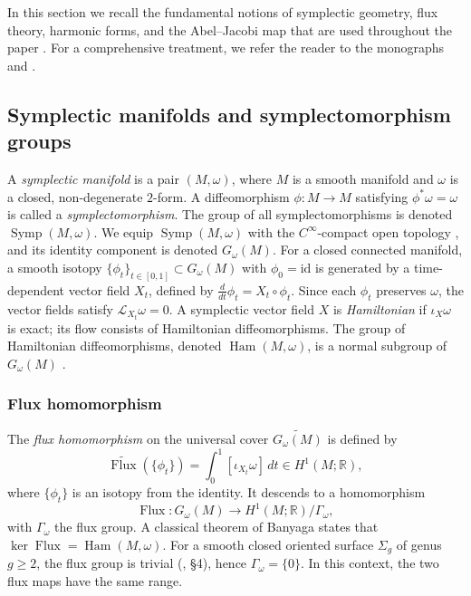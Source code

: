 \documentclass[11pt]{article}
\theoremstyle{definition}
\begin{document}
	In this section we recall the fundamental notions of symplectic geometry, flux
	theory, harmonic forms, and the Abel--Jacobi map that are used throughout the
	paper \cite{LeRoux2010, Petersen2006, McDuffSalamon, Polterovich,
		HoferZehnder}. For a comprehensive treatment, we refer the reader to the
	monographs \cite{Tchuaga2018} and \cite{Banyaga1997}.
	
	\subsection{Symplectic manifolds and symplectomorphism groups}
	
	A \emph{symplectic manifold} is a pair $(M,\omega)$, where $M$ is a smooth
	manifold and $\omega$ is a closed, non-degenerate $2$-form. A diffeomorphism
	$\phi:M\to M$ satisfying $\phi^*\omega=\omega$ is called a
	\emph{symplectomorphism}. The group of all symplectomorphisms is denoted
	$\operatorname{Symp}(M,\omega)$. We equip $\operatorname{Symp}(M,\omega)$ with
	the $C^\infty$-compact open topology \cite{MH}, and its identity component is
	denoted $G_\omega(M)$. For a closed connected manifold, a smooth isotopy
	$\{\phi_t\}_{t\in[0,1]}\subset G_\omega(M)$ with $\phi_0=\mathrm{id}$ is
	generated by a time-dependent vector field $X_t$, defined by
	$\frac{d}{dt}\phi_t = X_t\circ\phi_t$. Since each $\phi_t$ preserves $\omega$,
	the vector fields satisfy $\mathcal L_{X_t}\omega=0$. A symplectic vector field
	$X$ is \emph{Hamiltonian} if $\iota_X\omega$ is exact; its flow consists of
	Hamiltonian diffeomorphisms. The group of Hamiltonian diffeomorphisms, denoted
	$\operatorname{Ham}(M,\omega)$, is a normal subgroup of $G_\omega(M)$
	\cite{Banyaga1997}.
	
	\subsubsection{Flux homomorphism}
	
	The \emph{flux homomorphism} on the universal cover
	$\widetilde{G_\omega(M)}$ is defined by
	\[
	\widetilde{\operatorname{Flux}}(\{\phi_t\}) = \int_0^1 [\iota_{X_t}\omega]\,dt
	\in H^1(M;\mathbb R),
	\]
	where $\{\phi_t\}$ is an isotopy from the identity. It descends to a
	homomorphism
	\[
	\operatorname{Flux}: G_\omega(M) \longrightarrow H^1(M;\mathbb R)/\Gamma_\omega,
	\]
	with $\Gamma_\omega$ the flux group. A classical theorem of Banyaga
	\cite{Banyaga1997} states that $\ker \operatorname{Flux} =
	\operatorname{Ham}(M,\omega)$. For a smooth closed oriented surface $\Sigma_g$
	of genus $g\geq 2$, the flux group is trivial (\cite{Banyaga1997}, §4), hence
	$\Gamma_\omega=\{0\}$. In this context, the two flux maps have the same range.
	
\end{document}
